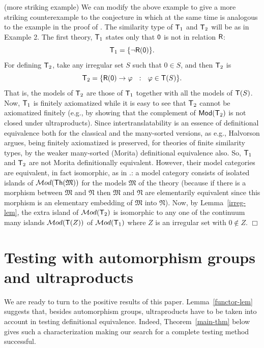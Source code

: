 \documentclass[12pt,leqno]{article}
\newcommand{\Mm}{\mbox{$\mathfrak M$}}
\newcommand{\Nn}{\mbox{$\mathfrak N$}}
\newcommand{\Th}{\mbox{\sf Th}}
\newcommand{\T}{\mbox{\sf T}}
\newcommand{\Mod}{\mbox{\sf Mod}}
\newcommand{\Cat}{\mbox{$\mathcal Mod$}}
\newcommand{\R}{\mbox{\sf R}}
\newcommand{\zero}{\mbox{\sf 0}}
\begin{document}
(more striking example) We can modify the above example to give a
more striking counterexample to the conjecture in \cite{BH16} which
at the same time is analogous to the example in the proof of
\cite[Theorem 5.7]{BH16}. The similarity type of $\T_1$ and $\T_2$
will be as in Example 2. The first theory, $\T_1$ states only that
$\zero$ is not in relation $\R$:
 \[ \T_1 = \{\lnot\R(\zero)\} .\]
For defining $\T_2$, take any irregular set $S$ such that $0\in S$, and then $\T_2$ is
\[
\T_2 = \{ \R(\zero)\to\varphi\ \ :\ \ \varphi\in\T(S) \}.\]
That is, the models of $\T_2$ are those of $\T_1$ together with all
the models of $\T(S)$.
%
Now, $\T_1$ is finitely axiomatized while it is easy to see that
$\T_2$ cannot be axiomatized finitely (e.g., by showing that the
complement of $\Mod(\T_2)$ is not closed under ultraproducts). Since
intertranslatability is an essence of definitional equivalence both
for the classical and the many-sorted versions, as e.g., Halvorson
\cite{Halvorson} argues, being finitely axiomatized is preserved,
for theories of finite similarity types, by the weaker many-sorted
(Morita) definitional equivalence also. So, $\T_1$ and $\T_2$ are
not Morita definitionally equivalent. However, their model
categories are equivalent, in fact isomorphic, as in \cite[Theroem
5.7]{BH16}.: a model category consists of isolated islands of
$\Cat(\Th(\Mm))$ for the models $\Mm$ of the theory (because if
there is a morphism between $\Mm$ and $\Nn$ then $\Mm$ and $\Nn$ are
elementarily equivalent since this morphism is an elementary
embedding of $\Mm$ into $\Nn$). Now, by Lemma~\ref{irreg-lem}, the
extra island of $\Cat(\T_2)$ is isomorphic to any one of the
continuum many islands $\Cat(\T(Z))$ of $\Cat(\T_1)$ where $Z$
is an irregular set with $0\notin Z$.
$\Box$\bigskip

\section{Testing with automorphism groups and ultraproducts}

We are ready to turn to the positive results of this paper. Lemma~\ref{functor-lem} suggests that, besides automorphism groups, ultraproducts have to be taken into account in testing definitional equivalence. Indeed, Theorem~\ref{main-thm} below gives such a characterization making our search for a complete testing method successful.
\end{document}
